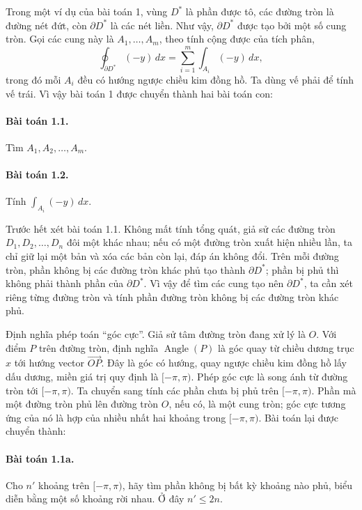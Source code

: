 \documentclass[11pt]{article}
\begin{document}
Trong một ví dụ của bài toán 1, vùng \(D^*\) là phần được tô, các đường tròn là
đường nét đứt, còn \(\partial D^*\) là các nét liền. Như vậy, \(\partial D^*\)
được tạo bởi một số cung tròn. Gọi các cung này là \(A_1,\ldots,A_m\), theo
tính cộng được của tích phân,
\[
  \oint_{\partial D^*}(-y)\,dx
  =\sum_{i=1}^{m}\int_{A_i}(-y)\,dx,
\]
trong đó mỗi \(A_i\) đều có hướng ngược chiều kim đồng hồ. Ta dùng vế phải để
tính vế trái. Vì vậy bài toán 1 được chuyển thành hai bài toán con:

\paragraph{Bài toán 1.1.}
Tìm \(A_1,A_2,\ldots,A_m\).

\paragraph{Bài toán 1.2.}
Tính \(\int_{A_i}(-y)\,dx\).

Trước hết xét bài toán 1.1. Không mất tính tổng quát, giả sử các đường tròn
\(D_1,D_2,\ldots,D_n\) đôi một khác nhau; nếu có một đường tròn xuất hiện nhiều
lần, ta chỉ giữ lại một bản và xóa các bản còn lại, đáp án không đổi. Trên mỗi
đường tròn, phần không bị các đường tròn khác phủ tạo thành \(\partial D^*\);
phần bị phủ thì không phải thành phần của \(\partial D^*\). Vì vậy để tìm các
cung tạo nên \(\partial D^*\), ta cần xét riêng từng đường tròn và tính phần
đường tròn không bị các đường tròn khác phủ.

Định nghĩa phép toán ``góc cực''. Giả sử tâm đường tròn đang xử lý là \(O\).
Với điểm \(P\) trên đường tròn, định nghĩa \(\operatorname{Angle}(P)\) là góc
quay từ chiều dương trục \(x\) tới hướng vector \(\overrightarrow{OP}\). Đây là
góc có hướng, quay ngược chiều kim đồng hồ lấy dấu dương, miền giá trị quy định
là \([-\pi,\pi)\). Phép góc cực là song ánh từ đường tròn tới \([-\pi,\pi)\).
Ta chuyển sang tính các phần chưa bị phủ trên \([-\pi,\pi)\). Phần mà một
đường tròn phủ lên đường tròn \(O\), nếu có, là một cung tròn; góc cực tương
ứng của nó là hợp của nhiều nhất hai khoảng trong \([-\pi,\pi)\). Bài toán lại
được chuyển thành:

\paragraph{Bài toán 1.1a.}
Cho \(n'\) khoảng trên \([-\pi,\pi)\), hãy tìm phần không bị bất kỳ khoảng nào
phủ, biểu diễn bằng một số khoảng rời nhau. Ở đây \(n'\le 2n\).
\end{document}

